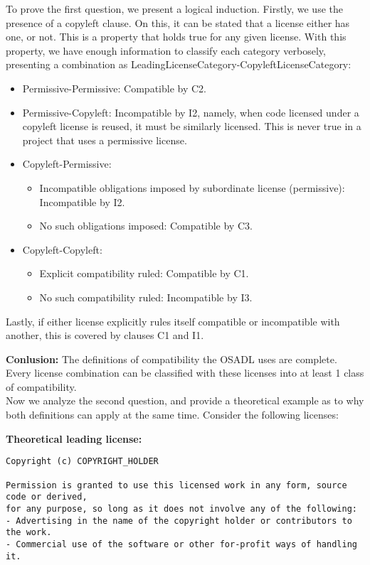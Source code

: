 To prove the first question, we present a logical induction. Firstly, we use the presence of a copyleft clause. On this, it can be stated that a license either has one, or not. This is a property that holds true for any given license. With this property, we have enough information to classify each category verbosely, presenting a combination as LeadingLicenseCategory-CopyleftLicenseCategory:

\begin{itemize}
	\item Permissive-Permissive: Compatible by C2.
	\item Permissive-Copyleft: Incompatible by I2, namely, when code licensed under a copyleft license is reused, it must be similarly licensed. This is never true in a project that uses a permissive license.
	\item Copyleft-Permissive:
	\begin{itemize}
		\item Incompatible obligations imposed by subordinate license (permissive): Incompatible by I2.
		\item No such obligations imposed: Compatible by C3.
	\end{itemize}
	\item Copyleft-Copyleft:
	\begin{itemize}
		\item Explicit compatibility ruled: Compatible by C1.
		\item No such compatibility ruled: Incompatible by I3.
	\end{itemize}
\end{itemize}

Lastly, if either license explicitly rules itself compatible or incompatible with another, this is covered by clauses C1 and I1.

\textbf{Conlusion:} The definitions of compatibility the OSADL uses are complete. Every license combination can be classified with these licenses into at least 1 class of compatibility. \\

Now we analyze the second question, and provide a theoretical example as to why both definitions can apply at the same time. Consider the following licenses:

\textbf{Theoretical leading license:}

\begin{verbatim}
Copyright (c) COPYRIGHT_HOLDER

Permission is granted to use this licensed work in any form, source code or derived,
for any purpose, so long as it does not involve any of the following:
- Advertising in the name of the copyright holder or contributors to the work.
- Commercial use of the software or other for-profit ways of handling it.
\end{verbatim}

